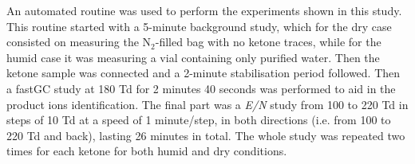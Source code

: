 



An automated routine was used to perform the experiments shown in this study. This routine started with a 5-minute background study, which for the dry case consisted on measuring the N$_2$-filled bag with no ketone traces, while for the humid case it was measuring a vial containing only purified water. Then the ketone sample was connected and a 2-minute stabilisation period followed. Then a fastGC study at 180 Td for 2 minutes 40 seconds was performed to aid in the  product ions identification.
The final part was a \textit{E/N} study from 100 to 220 Td in steps of 10 Td at a speed of 1 minute/step, in both directions (i.e. from 100 to 220 Td and back), lasting 26 minutes in total. The whole study was repeated two times for each ketone for both humid and dry conditions.






